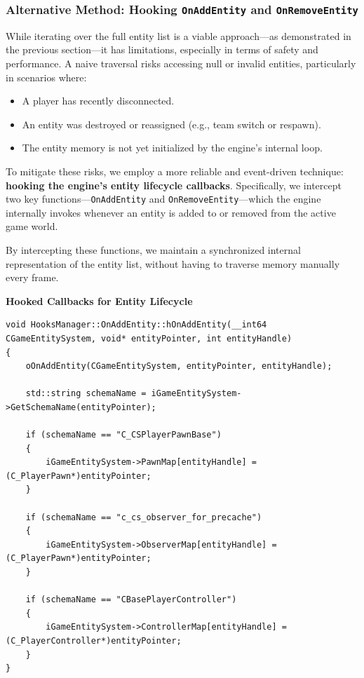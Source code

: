 \subsubsection{Alternative Method: Hooking \texttt{OnAddEntity} and \texttt{OnRemoveEntity}}

While iterating over the full entity list is a viable approach—as demonstrated in the previous section—it has limitations, especially in terms of safety and performance. A naive traversal risks accessing null or invalid entities, particularly in scenarios where:

\begin{itemize}
    \item A player has recently disconnected.
    \item An entity was destroyed or reassigned (e.g., team switch or respawn).
    \item The entity memory is not yet initialized by the engine's internal loop.
\end{itemize}

To mitigate these risks, we employ a more reliable and event-driven technique: \textbf{hooking the engine's entity lifecycle callbacks}. Specifically, we intercept two key functions—\texttt{OnAddEntity} and \texttt{OnRemoveEntity}—which the engine internally invokes whenever an entity is added to or removed from the active game world.

By intercepting these functions, we maintain a synchronized internal representation of the entity list, without having to traverse memory manually every frame.

\vspace{1em}
\noindent\textbf{Hooked Callbacks for Entity Lifecycle}

\begin{lstlisting}[style=cppstyle, caption={Hook: OnAddEntity}]
void HooksManager::OnAddEntity::hOnAddEntity(__int64 CGameEntitySystem, void* entityPointer, int entityHandle)
{
    oOnAddEntity(CGameEntitySystem, entityPointer, entityHandle);

    std::string schemaName = iGameEntitySystem->GetSchemaName(entityPointer);
    
    if (schemaName == "C_CSPlayerPawnBase")
    {
        iGameEntitySystem->PawnMap[entityHandle] = (C_PlayerPawn*)entityPointer;
    }

    if (schemaName == "c_cs_observer_for_precache")
    {
        iGameEntitySystem->ObserverMap[entityHandle] = (C_PlayerPawn*)entityPointer;
    }

    if (schemaName == "CBasePlayerController")
    {
        iGameEntitySystem->ControllerMap[entityHandle] = (C_PlayerController*)entityPointer;
    }
}
\end{lstlisting}

